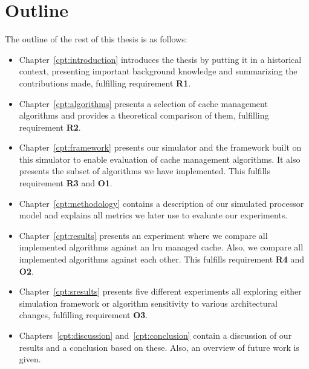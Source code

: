 \section{Outline}

The outline of the rest of this thesis is as follows:

\begin{itemize}
  \item Chapter~\ref{cpt:introduction} introduces the thesis by putting it in a historical context, presenting important background knowledge and summarizing the contributions made, fulfilling requirement \textbf{R1}.

  \item Chapter~\ref{cpt:algorithms} presents a selection of cache management algorithms and provides a theoretical comparison of them, fulfilling requirement \textbf{R2}.

  \item Chapter~\ref{cpt:framework} presents our simulator and the framework built on this simulator to enable evaluation of cache management algorithms. It also presents the subset of algorithms we have implemented. This fulfills requirement \textbf{R3} and \textbf{O1}.

  \item Chapter~\ref{cpt:methodology} contains a description of our simulated processor model and explains all metrics we later use to evaluate our experiments.

  \item Chapter~\ref{cpt:results} presents an experiment where we compare all implemented algorithms against an \gls{lru} managed cache. Also, we compare all implemented algorithms against each other. This fulfills requirement \textbf{R4} and \textbf{O2}.

  \item Chapter~\ref{cpt:sresults} presents five different experiments all exploring either simulation framework or algorithm sensitivity to various architectural changes, fulfilling requirement \textbf{O3}.

  \item Chapters~\ref{cpt:discussion} and~\ref{cpt:conclusion} contain a discussion of our results and a conclusion based on these. Also, an overview of future work is given.

\end{itemize}